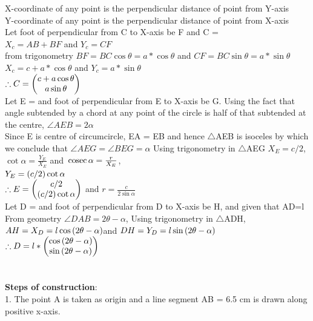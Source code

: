 \documentclass[journal,12pt,twocolumn]{IEEEtran}
\renewcommand\thesection{\arabic{section}}
\begin{document}
\begin{enumerate}[label=\thesection.\arabic*.,ref=\thesection.\theenumi]
X-coordinate of any point is the perpendicular distance of point from Y-axis\\
Y-coordinate of any point is the perpendicular distance of point from X-axis\\
Let foot of perpendicular from C to X-axis be F and C = \\
$X_c=AB+BF$ and $Y_c = CF$\\
from trigonometry $BF = BC\cos \theta = a*\cos \theta$ and $CF = BC\sin \theta = a*\sin \theta$ \\
$X_c = c + a*\cos \theta$ and $Y_c = a*\sin \theta$ \\ 
$\therefore C = \begin{pmatrix}c + a\cos \theta \\ a\sin \theta\end{pmatrix} $\\
Let E =  and foot of perpendicular from E to X-axis be G.
Using the fact that angle subtended by a chord at any point of the circle is half of that subtended at the centre,
$\angle AEB = 2\alpha$ \\
Since E is centre of circumcircle, EA = EB and hence $\bigtriangleup$AEB is isoceles by which we conclude that $\angle AEG = \angle BEG = \alpha$
Using trigonometry in $\bigtriangleup$AEG
$X_E=c/2$, $\cot \alpha = \frac{Y_E}{X_E}$ and $\,\text{cosec}\, \alpha = \frac{r}{X_E}$, \\
$Y_E=\left(c/2\right)\cot \alpha $\\ 
$\therefore E = \begin{pmatrix}c/2 \\ \left(c/2\right)\cot \alpha\end{pmatrix} $ and $r=\frac{c}{2\sin \alpha} $\\
Let D =  and foot of perpendicular from D to X-axis be H,
and given that AD=l\\
From geometry $\angle DAB = 2\theta-\alpha$,
Using trigonometry in $\bigtriangleup$ADH, 
$AH=X_D=l\cos \left(2\theta-\alpha\right)$and $DH=Y_D=l\sin \left(2\theta-\alpha\right)$
$\therefore D = l*\begin{pmatrix}\cos \left(2\theta-\alpha\right) \\ \sin \left(2\theta-\alpha\right)\end{pmatrix} $\\
\\
\\
\textbf{Steps of construction}:\\

1. The point A is taken as origin and a line segment AB = 6.5 cm is drawn along positive x-axis.\\


\end{enumerate}
\end{document}

